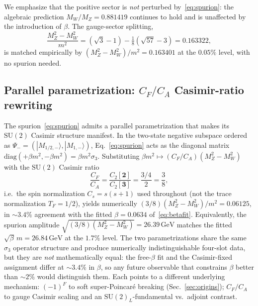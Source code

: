 \documentclass[twocolumn,aps,prd,floatfix,nofootinbib,superscriptaddress,10pt]{article}
\newcommand{\MW}{M_W}
\newcommand{\MZ}{M_Z}
\newcommand{\GeV}{\,\mathrm{GeV}}
\newcommand{\CF}{C_F}
\newcommand{\CA}{C_A}
\begin{document}
We emphasize that the positive sector is {\em not} perturbed by~\eqref{eq:spurion}: the algebraic prediction $\MW/\MZ = 0.881419$ continues to hold and is unaffected by the introduction of $\beta$. The gauge-sector splitting,
\begin{equation}
\frac{\MZ^2-\MW^2}{m^2}= (\sqrt{3}-1) - \tfrac{1}{8}(\sqrt{57}-3) = 0.163322,
\end{equation}
is matched empirically by $(\MZ^2-\MW^2)/m^2 = 0.163401$ at the $0.05\%$ level, with no spurion needed.

\subsection{Parallel parametrization: $\CF/\CA$ Casimir-ratio rewriting}
\label{ssec:Casimir-ratio}

The spurion~\eqref{eq:spurion} admits a parallel parametrization that makes its $\mathrm{SU}(2)$ Casimir structure manifest.  In the two-state negative subspace ordered as $\Psi_-=(|M_{1/2,-}\rangle,|M_{1,-}\rangle)$, Eq.~\eqref{eq:spurion} acts as the diagonal matrix $\mathrm{diag}(+\beta m^2,-\beta m^2)=\beta m^2\sigma_3$.  Substituting $\beta m^2 \mapsto (\CF/\CA)(\MZ^2-\MW^2)$ with the $\mathrm{SU}(2)$ Casimir ratio
\begin{equation}
\frac{\CF}{\CA}=\frac{C_2[\mathbf 2]}{C_2[\mathbf 3]}=\frac{3/4}{2}=\frac{3}{8},
\label{eq:CFCA}
\end{equation}
i.e.\ the spin normalization $C_s=s(s+1)$ used throughout (not the trace normalization $T_F=1/2$), yields numerically $(3/8)(\MZ^2-\MW^2)/m^2=0.06125$, in $\sim 3.4\%$ agreement with the fitted $\beta=0.0634$ of~\eqref{eq:betafit}.  Equivalently, the spurion amplitude $\sqrt{(3/8)(\MZ^2-\MW^2)}=26.39\GeV$ matches the fitted $\sqrt{\beta}\,m=26.84\GeV$ at the $1.7\%$ level.  The two parametrizations share the same $\sigma_3$ operator structure and produce numerically indistinguishable four-slot data, but they are \emph{not} mathematically equal: the free-$\beta$ fit and the Casimir-fixed assignment differ at $\sim 3.4\%$ in $\beta$, so any future observable that constrains $\beta$ better than $\sim 2\%$ would distinguish them.  Each points to a different underlying mechanism: $(-1)^F$ to soft super-Poincar\'e breaking (Sec.~\ref{sec:origins}); $\CF/\CA$ to gauge Casimir scaling and an $\mathrm{SU}(2)_L$-fundamental vs.\ adjoint contrast.
\end{document}

